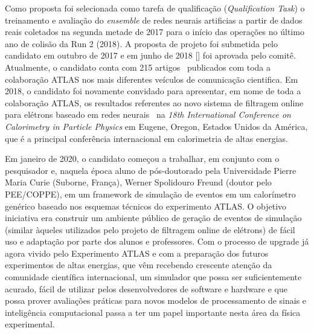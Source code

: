 Como proposta foi selecionada como tarefa de qualificação (\emph{Qualification Task}) o treinamento 
e avaliação do \emph{ensemble} de redes neurais artificias a partir de dados reais coletados na 
segunda metade de 2017 para o início das operações no último ano de colisão da Run 2 (2018). 
A proposta de projeto foi submetida pelo candidato em outubro de 2017 e em junho de 2018 [] 
foi aprovada pelo comitê. Atualmente, o candidato conta com 215 artigos~\cite{my_inspirehep, my_orcid} publicados com toda 
a colaboração ATLAS nos mais diferentes veículos de comunicação cientifica. Em 2018, o candidato 
foi novamente convidado para apresentar, em nome de toda a colaboração ATLAS, os resultados 
referentes ao novo sistema de filtragem online para elétrons baseado em redes neurais~\cite{calor2018}
na \emph{18th International Conference on Calorimetry in Particle Physics} em Eugene, Oregon, Estados 
Unidos da América, que é a principal conferência internacional em calorimetria de altas energias.



Em janeiro de 2020, o candidato começou a trabalhar, em conjunto com o pesquisador e, naquela 
época aluno de pós-doutorado pela Universidade Pierre Maria Curie (Suborne, França), Werner 
Spolidouro Freund (doutor pelo PEE/COPPE), em um framework de simulação de eventos em um 
calorímetro genérico baseado nos esquemas técnicos do experimento ATLAS.  O objetivo iniciativa 
era construir um ambiente público de geração de eventos de simulação (similar àqueles utilizados 
pelo projeto de filtragem online de elétrons) de fácil uso e adaptação por parte dos alunos e 
professores. Com o processo de upgrade já agora vivido pelo Experimento ATLAS e com a preparação 
dos futuros experimentos de altas energias, que vêm recebendo crescente atenção da comunidade 
científica internacional, um simulador que possa ser suficientemente acurado, fácil de utilizar 
pelos desenvolvedores de software e hardware e que possa prover avaliações práticas para novos 
modelos de processamento de sinais e inteligência computacional passa a ter um papel importante 
nesta área da física experimental.


